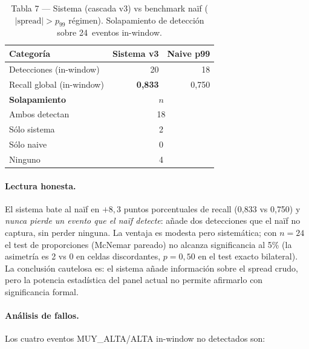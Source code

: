 \documentclass[11pt,a4paper]{article}
\begin{document}
\begin{table}[H]
\centering
\small
\caption{Tabla 7 — Sistema (cascada v3) vs benchmark naïf (\(|\mathrm{spread}|>p_{99}\) régimen).
Solapamiento de detección sobre 24~eventos in-window.}
\label{tab:t7}
\begin{tabular}{lrr}
\toprule
\textbf{Categoría} & \textbf{Sistema v3} & \textbf{Naive p99} \\
\midrule
Detecciones (in-window)         & 20 & 18 \\
Recall global (in-window)        & \textbf{0{,}833} & 0{,}750 \\
\midrule
\textbf{Solapamiento}            & \multicolumn{2}{c}{$n$} \\
\midrule
Ambos detectan                   & \multicolumn{2}{c}{18} \\
Sólo sistema                     & \multicolumn{2}{c}{2} \\
Sólo naive                       & \multicolumn{2}{c}{0} \\
Ninguno                          & \multicolumn{2}{c}{4} \\
\bottomrule
\end{tabular}
\end{table}

\paragraph{Lectura honesta.} El sistema bate al naïf en $+8{,}3$ puntos
porcentuales de recall (0{,}833 vs 0{,}750) y \emph{nunca pierde un
evento que el naïf detecte}: añade dos detecciones que el naïf no
captura, sin perder ninguna. La ventaja es modesta pero sistemática;
con $n=24$ el test de proporciones (McNemar pareado) no alcanza
significancia al 5\% (la asimetría es 2 vs 0 en celdas discordantes,
$p = 0{,}50$ en el test exacto bilateral). La conclusión cautelosa es:
el sistema añade información sobre el spread crudo, pero la potencia
estadística del panel actual no permite afirmarlo con significancia
formal.

\paragraph{Análisis de fallos.} Los cuatro eventos MUY\_ALTA/ALTA
in-window no detectados son:
\end{document}
